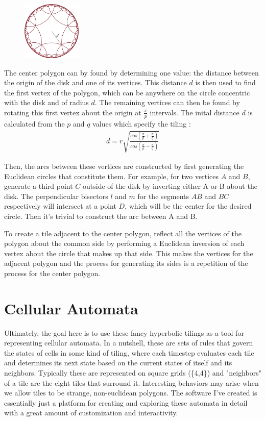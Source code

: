 \documentclass[letterpaper,12pt]{article}
\begin{document}
\begin{figure}
\includegraphics[width=0.25\textwidth]{../media/tilingDistance.png}
\end{figure}

The center polygon can by found by determining one value: the distance between the origin of the disk and one of its vertices. This distance $d$ is then used to find the first vertex of the polygon, which can be anywhere on the circle concentric with the disk and of radius $d$.  The remaining vertices can then be found by rotating this first vertex about the origin at $\frac{\pi}{p}$ intervals. The inital distance $d$ is calculated from the $p$ and $q$ values which specify the tiling \cite[p.295]{margenstern}:
\begin{gather*}
d = r\sqrt{\frac{cos(\frac{\pi}{p} + \frac{\pi}{q})}{cos(\frac{\pi}{p} - \frac{\pi}{q})}}
\end{gather*}

Then, the arcs between these vertices are constructed by first generating the Euclidean circles that constitute them. For example, for two vertices $A$ and $B$, generate a third point $C$ outside of the disk by inverting either A or B about the disk. The perpendicular bisectors $l$ and $m$ for the segments $AB$ and $BC$ respectively will intersect at a point $D$, which will be the center for the desired circle. Then it's trivial to construct the arc between A and B.

To create a tile adjacent to the center polygon, reflect all the vertices of the polygon about the common side by performing a Euclidean inversion of each vertex about the circle that makes up that side. This makes the vertices for the adjacent polygon and the process for generating its sides is a repetition of the process for the center polygon.

\section*{Cellular Automata}

Ultimately, the goal here is to use these fancy hyperbolic tilings as a tool for representing cellular automata. In a nutshell, these are sets of rules that govern the states of cells in some kind of tiling, where each timestep evaluates each tile and determines its next state based on the current states of itself and its neighbors. Typically these are represented on square grids (\{4,4\}) and "neighbors" of a tile are the eight tiles that surround it. Interesting behaviors may arise when we allow tiles to be strange, non-euclidean polygons. The software I've created is essentially just a platform for creating and exploring these automata in detail with a great amount of customization and interactivity.
\end{document}
